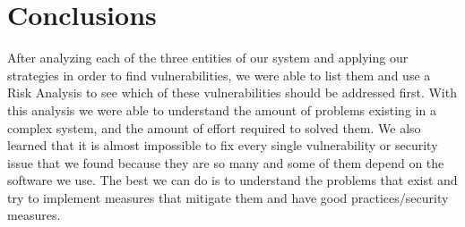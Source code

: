 \section{Conclusions}

After analyzing each of the three entities of our system and applying our strategies in order to find vulnerabilities, we were able to list them and use a Risk Analysis to see which of these vulnerabilities should be addressed first.
With this analysis we were able to understand the amount of problems existing in a complex system, and the amount of effort required to solved them. We also learned that it is almost impossible to fix every single vulnerability or security issue that we found because they are so many and some of them depend on the software we use. The best we can do is to understand the problems that exist and try to implement measures that mitigate them and have good practices/security measures.

\pagebreak